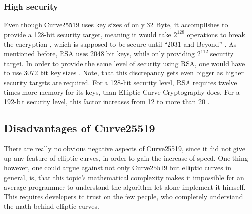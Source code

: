 \subsubsection{High security}
Even though Curve25519 uses key sizes of only 32 Byte, it accomplishes to provide a 128-bit security target, meaning it would take $ 2^{128} $ operations to break the encryption \cite{SecLevel}, which is supposed to be secure until “2031 and Beyond” \cite{KeySize}. As mentioned before, RSA uses 2048 bit keys, while only providing $ 2^{112} $ security target. In order to provide the same level of security using RSA, one would have to use 3072 bit key sizes \cite{KeySize}. Note, that this discrepancy gets even bigger as higher security targets are required. For a 128-bit security level, RSA requires twelve times more memory for its keys, than Elliptic Curve Cryptography does. For a 192-bit security level, this factor increases from 12 to more than 20 \cite{SecLevelInc}.

\subsection{Disadvantages of Curve25519}
There are really no obvious negative aspects of Curve25519, since it did not give up any feature of elliptic curves, in order to gain the increase of speed. One thing however, one could argue against not only Curve25519 but elliptic curves in general, is, that this topic's mathematical complexity makes it impossible for an average programmer to understand the algorithm let alone implement it himself. This requires developers to trust on the few people, who completely understand the math behind elliptic curves.
